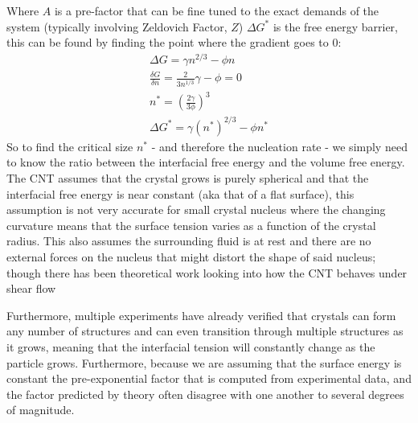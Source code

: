 \documentclass[a4paper,oneside,11pt]{book}
\begin{document}
Where $A$ is a pre-factor that can be fine tuned to the exact demands of the system (typically involving Zeldovich Factor, $Z$) $\Delta G^*$ is the free energy barrier, this can be found by finding the point where the gradient goes to 0:
\begin{align}
	\Delta G = \gamma n^{2/3}-\phi n \\
	\frac{\delta G}{\delta n} = \frac{2}{3n^{1/3}}\gamma - \phi  = 0 \\
	n^* = \left( \frac{2\gamma}{3\phi} \right)^3 \\
	\Delta G^* = \gamma (n^*)^{2/3} - \phi n^*
\end{align}
So to find the critical size $n^*$  - and therefore the nucleation rate - we simply need to know the ratio between the interfacial free energy and the volume free energy. The CNT assumes that the crystal grows is purely spherical and that the interfacial free energy is near constant (aka that of a flat surface), this assumption is not very accurate for small crystal nucleus where the changing curvature means that the surface tension varies as a function of the crystal radius. This also assumes the surrounding fluid is at rest and there are no external forces on the nucleus that might distort the shape of said nucleus; though there has been theoretical work looking into how the CNT behaves under shear flow \cite{Debuysschere2023, Mura2016, Richard2015}

Furthermore, multiple experiments have already verified that crystals can form any number of structures and can even transition through multiple structures as it grows, meaning that the interfacial tension will constantly change as the particle grows. Furthermore, because we are assuming that the surface energy is constant the pre-exponential factor that is computed from experimental data, and the factor predicted by theory often disagree with one another to several degrees of magnitude. 
\end{document}
